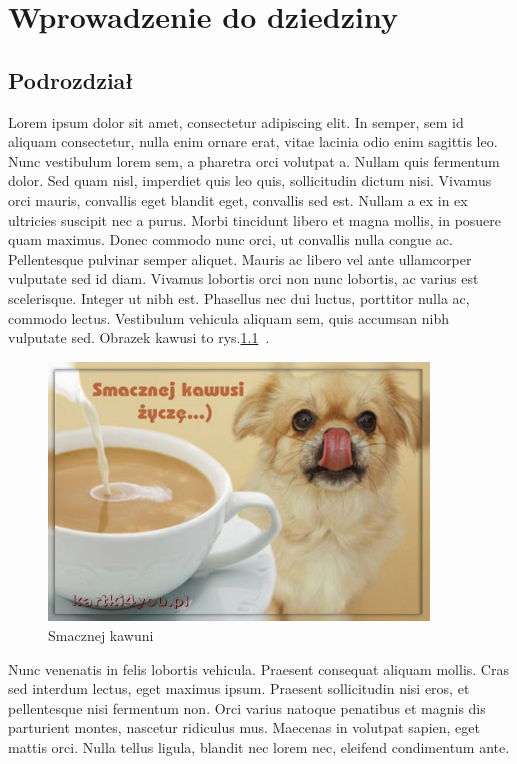 \chapter{Wprowadzenie do dziedziny}\label{chap:field}




\section{Podrozdział}
Lorem ipsum dolor sit amet, consectetur adipiscing elit. In semper, sem id aliquam consectetur, nulla enim ornare erat, vitae lacinia odio enim sagittis leo. Nunc vestibulum lorem sem, a pharetra orci volutpat a. Nullam quis fermentum dolor. Sed quam nisl, imperdiet quis leo quis, sollicitudin dictum nisi. Vivamus orci mauris, convallis eget blandit eget, convallis sed est. Nullam a ex in ex ultricies suscipit nec a purus. Morbi tincidunt libero et magna mollis, in posuere quam maximus. Donec commodo nunc orci, ut convallis nulla congue ac. Pellentesque pulvinar semper aliquet. Mauris ac libero vel ante ullamcorper vulputate sed id diam. Vivamus lobortis orci non nunc lobortis, ac varius est scelerisque. Integer ut nibh est. Phasellus nec dui luctus, porttitor nulla ac, commodo lectus. Vestibulum vehicula aliquam sem, quis accumsan nibh vulputate sed. Obrazek kawusi to rys.\ref{fig:coffee}~\cite{dx12_2}.

\begin{figure}[htbp]
    \centering
    \includegraphics[width=0.9\textwidth]{images/kawunia.png}
    \caption{Smacznej kawuni}\label{fig:coffee}
\end{figure}

Nunc venenatis in felis lobortis vehicula. Praesent consequat aliquam mollis. Cras sed interdum lectus, eget maximus ipsum. Praesent sollicitudin nisi eros, et pellentesque nisi fermentum non. Orci varius natoque penatibus et magnis dis parturient montes, nascetur ridiculus mus. Maecenas in volutpat sapien, eget mattis orci. Nulla tellus ligula, blandit nec lorem nec, eleifend condimentum ante.


